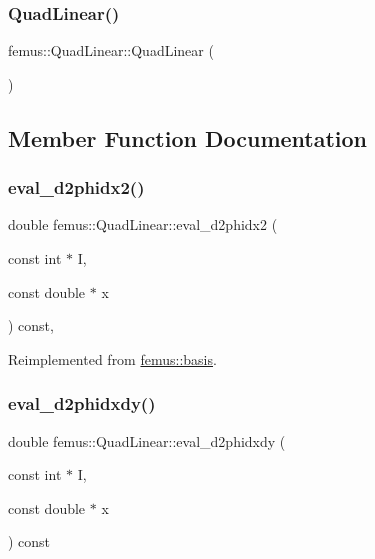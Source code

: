 \subsubsection{\texorpdfstring{Quad\+Linear()}{QuadLinear()}}
{\footnotesize\ttfamily femus\+::\+Quad\+Linear\+::\+Quad\+Linear (\begin{DoxyParamCaption}{ }\end{DoxyParamCaption})\hspace{0.3cm}{\ttfamily [inline]}}



\subsection{Member Function Documentation}
\mbox{\label{classfemus_1_1_quad_linear_af75fece3983ee9169c452c287c6b8d09}} 
\subsubsection{\texorpdfstring{eval\+\_\+d2phidx2()}{eval\_d2phidx2()}}
{\footnotesize\ttfamily double femus\+::\+Quad\+Linear\+::eval\+\_\+d2phidx2 (\begin{DoxyParamCaption}\item[{const int $\ast$}]{I,  }\item[{const double $\ast$}]{x }\end{DoxyParamCaption}) const\hspace{0.3cm}{\ttfamily [inline]}, {\ttfamily [virtual]}}



Reimplemented from \mbox{\hyperlink{classfemus_1_1basis_a0a9839e75d1c9c8302486fc072eed028}{femus\+::basis}}.

\mbox{\label{classfemus_1_1_quad_linear_a2dd33af4e3c5c38c77ed0b803cf8f099}} 
\subsubsection{\texorpdfstring{eval\+\_\+d2phidxdy()}{eval\_d2phidxdy()}}
{\footnotesize\ttfamily double femus\+::\+Quad\+Linear\+::eval\+\_\+d2phidxdy (\begin{DoxyParamCaption}\item[{const int $\ast$}]{I,  }\item[{const double $\ast$}]{x }\end{DoxyParamCaption}) const\hspace{0.3cm}{\ttfamily [virtual]}}




